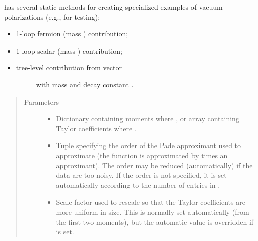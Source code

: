 \documentclass[letterpaper,10pt,english]{sphinxmanual}
\begin{document}
\begin{fulllineitems}
{\hyperref[\detokenize{g2tools:g2tools.vacpol}]{}} has several static methods for creating specialized
examples of vacuum polarizations (e.g., for testing):
\begin{itemize}
\item {} 
 \textendash{} 1-loop fermion (mass ) contribution;

\item {} 
 \textendash{} 1-loop scalar (mass ) contribution;

\item {} \begin{description}
\item[{ \textendash{} tree-level contribution from vector}] \leavevmode
with mass  and decay constant .

\end{description}

\end{itemize}
\begin{quote}\begin{description}
\item[{Parameters}] \leavevmode\begin{itemize}
\item {} 
 \textendash{} Dictionary containing moments where ,
or array containing Taylor coefficients where
.

\item {} 
 \textendash{} Tuple  specifying the order of the Pade
approximant used to approximate  (the function is
approximated by  times an  approximant). The
order may be reduced (automatically) if the data are too noisy. If
the order is not specified, it is set automatically according to
the number of entries in .

\item {} 
 \textendash{} Scale factor used to rescale  so that
the Taylor coefficients are more uniform in size. This is
normally set automatically (from the first two moments),
but the automatic value is overridden if  is set.


\end{itemize}
\end{description}
\end{quote}
\end{fulllineitems}
\end{document}
